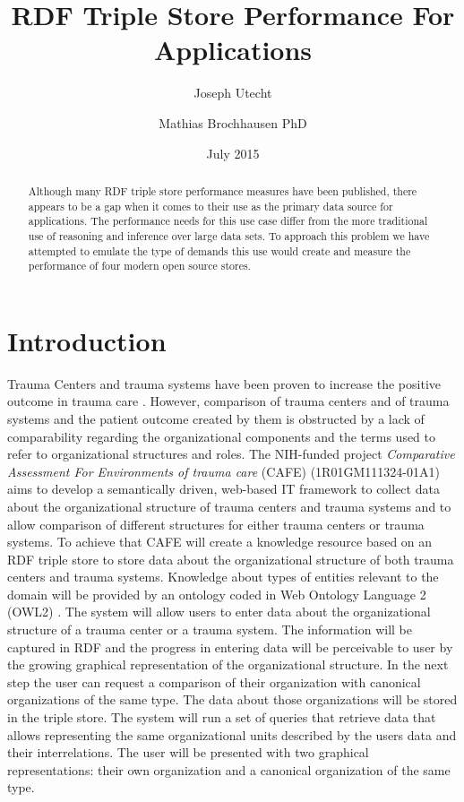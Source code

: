 \documentclass{llncs}
\title{RDF Triple Store Performance For Applications}
\author{Joseph Utecht \and Mathias Brochhausen PhD}
\institute{Department of Biomedical Informatics, University of Arkansas for Medical Sciences, Little Rock, AR}
\date{July 2015}
\begin{document}
\maketitle

\begin{abstract}
Although many RDF triple store performance measures have been published, there appears to be a gap when it comes to their use as the primary data source for applications.  The performance needs for this use case differ from the more traditional use of reasoning and inference over large data sets.  To approach this problem we have attempted to emulate the type of demands this use would create and measure the performance of four modern open source stores.
\end{abstract}
\section{Introduction}

Trauma Centers and trauma systems have been proven to increase the positive outcome in trauma care \cite{pmid16427544, pmid21206286, pmid26151508}. However, comparison of trauma centers and of trauma systems and the patient outcome created by them is obstructed by a lack of comparability regarding the organizational components and the terms used to refer to organizational structures and roles. The NIH-funded project \textit{Comparative Assessment For Environments of trauma care} (CAFE) (1R01GM111324-01A1)  aims to develop a semantically driven, web-based IT framework to collect data about the organizational structure of trauma centers and trauma systems and to allow comparison of different structures for either trauma centers or trauma systems. To achieve that CAFE will create a knowledge resource based on an RDF triple store to store data about the organizational structure of both trauma centers and trauma systems. Knowledge about types of entities relevant to the domain will be provided by an ontology coded in Web Ontology Language 2 (OWL2) \cite{OWL2}. The system will allow users to enter data about the organizational structure of a trauma center or a trauma system. The information will be captured in RDF and the progress in entering data will be perceivable to user by the growing graphical representation of the organizational structure. In the next step the user can request a comparison of their organization with canonical organizations of the same type. The data about those organizations will be stored in the triple store. The system will run a set of queries that retrieve data that allows representing the same organizational units described by the users data and their interrelations. The user will be presented with two graphical representations: their own organization and a canonical organization of the same type.
\end{document}
